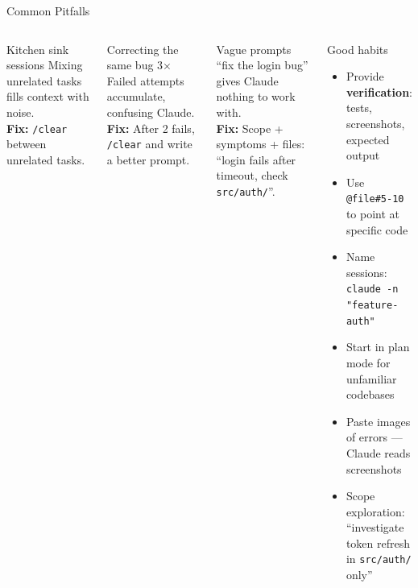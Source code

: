 \documentclass[aspectratio=169]{beamer}
\begin{document}
\begin{frame}{Common Pitfalls}
\begin{columns}[T]
\begin{alertblock}{Kitchen sink sessions}
Mixing unrelated tasks fills context with noise. \\
\textbf{Fix:} \texttt{/clear} between unrelated tasks.
\end{alertblock}

\smallskip
\begin{alertblock}{Correcting the same bug 3$\times$}
Failed attempts accumulate, confusing Claude. \\
\textbf{Fix:} After 2 fails, \texttt{/clear} and write a better prompt.
\end{alertblock}

\smallskip
\begin{alertblock}{Vague prompts}
``fix the login bug'' gives Claude nothing to work with. \\
\textbf{Fix:} Scope + symptoms + files: ``login fails after timeout, check \texttt{src/auth/}''.
\end{alertblock}

\begin{exampleblock}{Good habits}
\begin{itemize}
  \item Provide \textbf{verification}: tests, screenshots, expected output
  \item Use \texttt{@file\#5-10} to point at specific code
  \item Name sessions: \texttt{claude -n "feature-auth"}
  \item Start in plan mode for unfamiliar codebases
  \item Paste images of errors --- Claude reads screenshots
  \item Scope exploration: ``investigate token refresh in \texttt{src/auth/} only''
\end{itemize}
\end{exampleblock}
\end{columns}
\end{frame}
\end{document}
